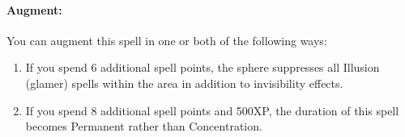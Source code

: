 \paragraph{Augment:} You can augment this spell in one or both of the following ways:
\begin{enumerate}
\item If you spend 6 additional spell points, the sphere suppresses all Illusion (glamer) spells within the area in addition to invisibility effects.
\item If you spend 8 additional spell points and 500XP, the duration of this spell becomes Permanent rather than Concentration.
\end{enumerate}
% 
% 
% 
